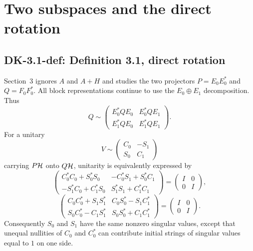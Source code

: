 \section{Two subspaces and the direct rotation}

\subsection*{DK-3.1-def: Definition 3.1, direct rotation}
Section~3 ignores $A$ and $A+H$ and studies the two projectors $P=E_0E_0^*$ and $Q=F_0F_0^*$.  All block representations continue to use the $E_0\oplus E_1$ decomposition.  Thus
\begin{equation}
 Q\sim
 \begin{pmatrix}
 E_0^*QE_0&E_0^*QE_1\\
 E_1^*QE_0&E_1^*QE_1
 \end{pmatrix}.
 \tag{3.1}
\end{equation}
For a unitary
\[
 V\sim\begin{pmatrix}C_0&-S_1\\S_0&C_1\end{pmatrix}
\]
carrying $P\mathcal{H}$ onto $Q\mathcal{H}$, unitarity is equivalently expressed by
\begin{equation}
 \begin{pmatrix}
 C_0^*C_0+S_0^*S_0&-C_0^*S_1+S_0^*C_1\\
 -S_1^*C_0+C_1^*S_0&S_1^*S_1+C_1^*C_1
 \end{pmatrix}
 =\begin{pmatrix}I&0\\0&I\end{pmatrix},
 \tag{3.2}
\end{equation}
\begin{equation}
 \begin{pmatrix}
 C_0C_0^*+S_1S_1^*&C_0S_0^*-S_1C_1^*\\
 S_0C_0^*-C_1S_1^*&S_0S_0^*+C_1C_1^*
 \end{pmatrix}
 =\begin{pmatrix}I&0\\0&I\end{pmatrix}.
 \tag{3.3}
\end{equation}
Consequently $S_0$ and $S_1$ have the same nonzero singular values, except that unequal nullities of $C_0$ and $C_0^*$ can contribute initial strings of singular values equal to $1$ on one side.

